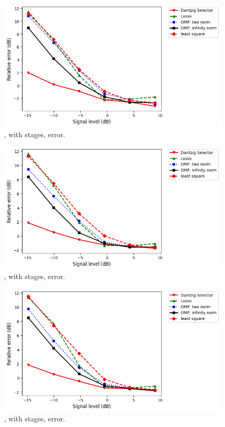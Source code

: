 \begin {figure} [H]
\includegraphics [width = \textwidth] {error-small-square-four.png}
\caption {, with  stages, error.}
\end {figure}

\begin {figure} [H]
\includegraphics [width = \textwidth] {error-small-tall-four.png}
\caption {, with  stages, error.}
\end {figure}

\begin {figure} [H]
\includegraphics [width = \textwidth] {error-small-wide-four.png}
\caption {, with  stages, error.}
\end {figure}

